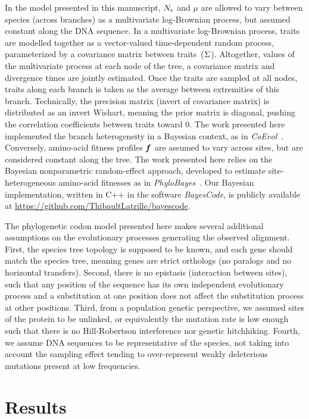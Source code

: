 In the model presented in this manuscript, $N_{\mathrm{e}}$ and $\mu$ are allowed to vary between species (across branches) as a multivariate log-Brownian process, but assumed constant along the \acrshort{DNA} sequence.
In a multivariate log-Brownian process, traits are modelled together as a vector-valued time-dependent random process, parameterized by a covariance matrix between traits~($\Sigma$).
Altogether, values of the multivariate process at each node of the tree, a covariance matrix and divergence times are jointly estimated.
Once the traits are sampled at all nodes, traits along each branch is taken as the average between extremities of this branch.
Technically, the precision matrix (invert of covariance matrix) is distributed as an invert Wishart, meaning the prior matrix is diagonal, pushing the correlation coefficients between traits toward $0$.
The work presented here implemented the branch heterogeneity in a Bayesian context, as in \textit{CoEvol}~\citep{Lartillot2011}.
Conversely, amino-acid fitness profiles $\bm{f}$ are assumed to vary across sites, but are considered constant along the tree.
The work presented here relies on the Bayesian nonparametric random-effect approach, developed to estimate site-heterogeneous amino-acid fitnesses as in \textit{PhyloBayes}~\citep{Rodrigue2010}.
Our Bayesian implementation, written in C++ in the software \textit{BayesCode}, is publicly available at \url{https://github.com/ThibaultLatrille/bayescode}.

The phylogenetic codon model presented here makes several additional assumptions on the evolutionary processes generating the observed alignment.
First, the species tree topology is supposed to be known, and each gene should match the species tree, meaning genes are strict orthologs (no paralogs and no horizontal transfers).
Second, there is no epistasis (interaction between sites), such that any position of the sequence has its own independent evolutionary process and a substitution at one position does not affect the substitution process at other positions.
Third, from a population genetic perspective, we assumed sites of the protein to be unlinked, or equivalently the mutation rate is low enough such that there is no Hill-Robertson interference nor genetic hitchhiking.
Fourth, we assume \acrshort{DNA} sequences to be representative of the species, not taking into account the sampling effect tending to over-represent weakly deleterious mutations present at low frequencies.


\section{Results}
\label{sec:Results}

